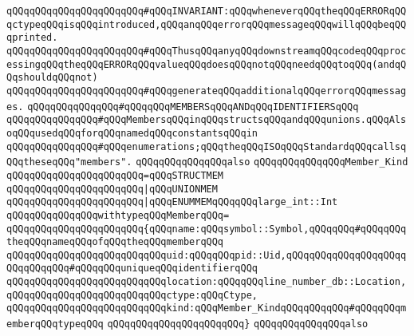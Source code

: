\newline
\verb|qQQqqQQqqQQqqQQqqQQqqQQq#qQQqINVARIANT:qQQqwheneverqQQqtheqQQqERRORqQQqctypeqQQqisqQQqintroduced,qQQqanqQQqerrorqQQqmessageqQQqwillqQQqbeqQQqprinted.|\newline
\verb|qQQqqQQqqQQqqQQqqQQqqQQq#qQQqThusqQQqanyqQQqdownstreamqQQqcodeqQQqprocessingqQQqtheqQQqERRORqQQqvalueqQQqdoesqQQqnotqQQqneedqQQqtoqQQq(andqQQqshouldqQQqnot)|\newline
\verb|qQQqqQQqqQQqqQQqqQQqqQQq#qQQqgenerateqQQqadditionalqQQqerrorqQQqmessages.|\newline
\newline
\verb|qQQqqQQqqQQqqQQq#qQQqqQQqMEMBERSqQQqANDqQQqIDENTIFIERSqQQq|\newline
\newline
\verb|qQQqqQQqqQQqqQQq#qQQqMembersqQQqinqQQqstructsqQQqandqQQqunions.qQQqAlsoqQQqusedqQQqforqQQqnamedqQQqconstantsqQQqin|\newline
\verb|qQQqqQQqqQQqqQQq#qQQqenumerations;qQQqtheqQQqISOqQQqStandardqQQqcallsqQQqtheseqQQq"members".|\newline
\verb|qQQqqQQqqQQqqQQqalso|\newline
\verb|qQQqqQQqqQQqqQQqMember_Kind|\newline
\verb|qQQqqQQqqQQqqQQqqQQqqQQq=qQQqSTRUCTMEM|\newline
\verb|qQQqqQQqqQQqqQQqqQQqqQQq|\verb#|qQQqUNIONMEM#\newline
\verb|qQQqqQQqqQQqqQQqqQQqqQQq|\verb#|qQQqENUMMEMqQQqqQQqlarge_int::Int#\newline
\newline
\verb|qQQqqQQqqQQqqQQqwithtypeqQQqMemberqQQq=|\newline
\verb|qQQqqQQqqQQqqQQqqQQqqQQq{qQQqname:qQQqsymbol::Symbol,qQQqqQQq#qQQqqQQqtheqQQqnameqQQqofqQQqtheqQQqmemberqQQq|\newline
\verb|qQQqqQQqqQQqqQQqqQQqqQQqqQQquid:qQQqqQQqpid::Uid,qQQqqQQqqQQqqQQqqQQqqQQqqQQqqQQq#qQQqqQQquniqueqQQqidentifierqQQq|\newline
\verb|qQQqqQQqqQQqqQQqqQQqqQQqqQQqlocation:qQQqqQQqline_number_db::Location,|\newline
\verb|qQQqqQQqqQQqqQQqqQQqqQQqqQQqctype:qQQqCtype,|\newline
\verb|qQQqqQQqqQQqqQQqqQQqqQQqqQQqkind:qQQqMember_KindqQQqqQQqqQQq#qQQqqQQqmemberqQQqtypeqQQq|\newline
\verb|qQQqqQQqqQQqqQQqqQQqqQQq}|\newline
\newline
\verb|qQQqqQQqqQQqqQQqalso|\newline
